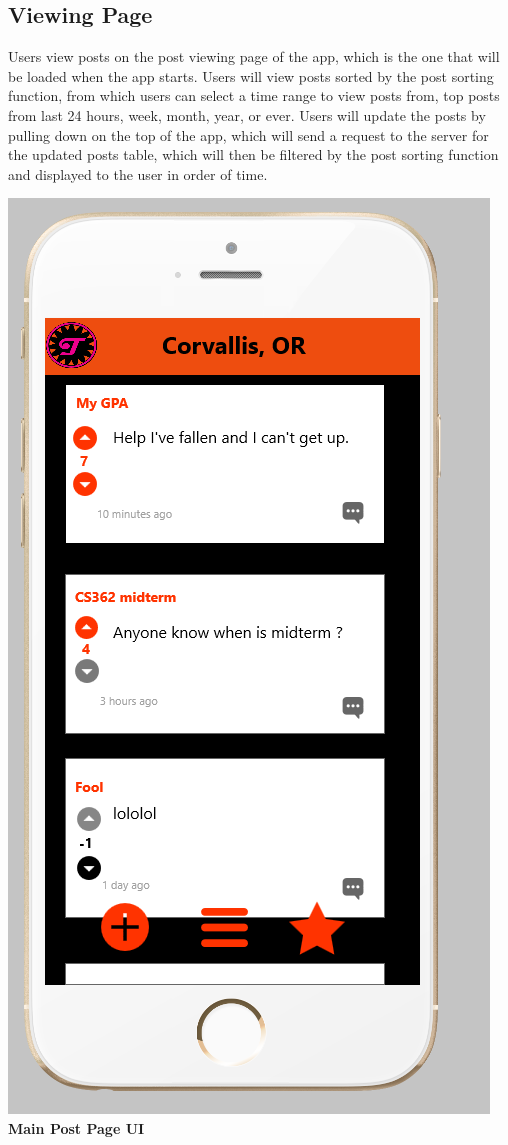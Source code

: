 \documentclass[12pt]{article}
\begin{document}
\subsection{Viewing Page}
Users view posts on the post viewing page of the app, which is the one that will be loaded when the app starts. Users will view posts sorted by the post sorting function, from which users can select a time range to view posts from, top posts from last 24 hours, week, month, year, or ever. Users will update the posts by pulling down on the top of the app, which will send a request to the server for the updated posts table, which will then be filtered by the post sorting function and displayed to the user in order of time.
\begin{center}
\includegraphics[scale=0.30]{img/ui/view}\linebreak
\textbf{Main Post Page UI}
  \end{center}
\end{document}
